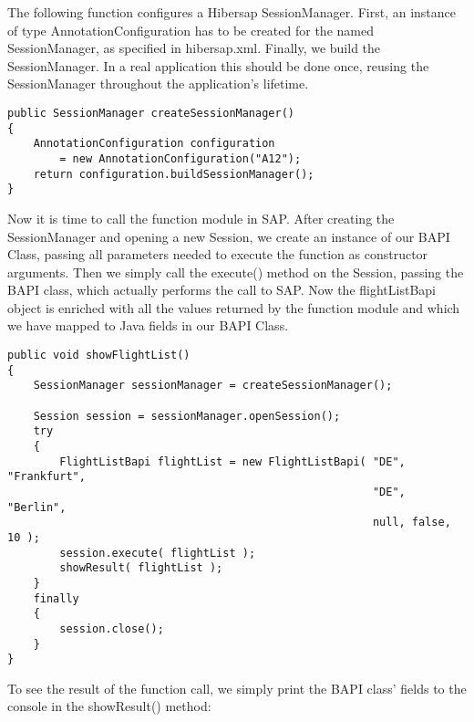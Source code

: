 The following function configures a Hibersap SessionManager. First, an instance of type AnnotationConfiguration has to be created for the named SessionManager, as specified in hibersap.xml. Finally, we build the SessionManager. In a real application this should be done once, reusing the SessionManager throughout the application's lifetime.

\begin{lstlisting}[caption=Creating the SessionManager]
public SessionManager createSessionManager()
{
    AnnotationConfiguration configuration 
        = new AnnotationConfiguration("A12");
    return configuration.buildSessionManager();
}
\end{lstlisting}

Now it is time to call the function module in SAP.
After creating the SessionManager and opening a new Session, we create an instance of our
BAPI Class, passing all parameters needed to execute the function as constructor arguments.
Then we simply call the execute() method on the Session, passing the BAPI class,
which actually performs the call to SAP. Now the flightListBapi object is enriched with all the
values returned by the function module and which we have mapped to Java fields in our BAPI Class.

\begin{lstlisting}[caption=Executing the function]
public void showFlightList()
{
    SessionManager sessionManager = createSessionManager();

    Session session = sessionManager.openSession();
    try
    {
        FlightListBapi flightList = new FlightListBapi( "DE", "Frankfurt", 
                                                        "DE", "Berlin", 
                                                        null, false, 10 );
        session.execute( flightList );
        showResult( flightList );
    }
    finally
    {
        session.close();
    }
}
\end{lstlisting}

To see the result of the function call, we simply print the BAPI class' fields to the console in the
showResult() method:

